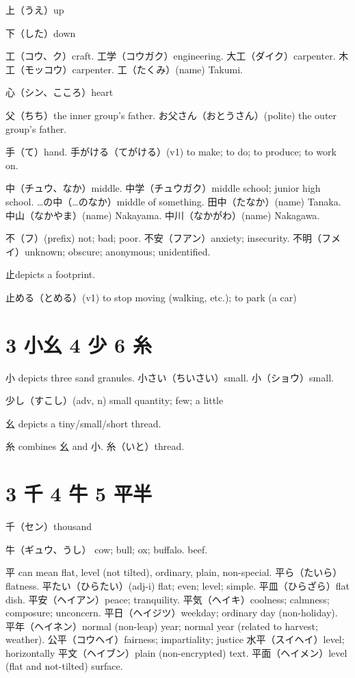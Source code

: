 上（うえ）up

下（した）down

工（コウ、ク）craft.
工学（コウガク）engineering.
大工（ダイク）carpenter.
木工（モッコウ）carpenter.
工（たくみ）(name) Takumi.

心（シン、こころ）heart

父（ちち）the inner group's father.
お父さん（おとうさん）(polite) the outer group's father.

手（て）hand.
手がける（てがける）(v1) to make; to do; to produce; to work on.

中（チュウ、なか）middle.
中学（チュウガク）middle school; junior high school.
…の中（…のなか）middle of something.
田中（たなか）(name) Tanaka.
中山（なかやま）(name) Nakayama.
中川（なかがわ）(name) Nakagawa.

不（フ）(prefix) not; bad; poor.
不安（フアン）anxiety; insecurity.
不明（フメイ）unknown; obscure; anonymous; unidentified.

止depicts a footprint.

止める（とめる）(v1) to stop moving (walking, etc.); to park (a car)

\section{3 小幺 4 少 6 糸}

小 depicts three sand granules.
小さい（ちいさい）small.
小（ショウ）small.

少し（すこし）(adv, n) small quantity; few; a little

幺 depicts a tiny/small/short thread.

糸 combines 幺 and 小.
糸（いと）thread.

\section{3 千 4 牛 5 平半}

千（セン）thousand

牛（ギュウ、うし）
cow; bull; ox; buffalo.
beef.

平 can mean flat, level (not tilted), ordinary, plain, non-special.
平ら（たいら）flatness.
平たい（ひらたい）(adj-i) flat; even; level; simple.
平皿（ひらざら）flat dish.
平安（ヘイアン）peace; tranquility.
平気（ヘイキ）coolness; calmness; composure; unconcern.
平日（ヘイジツ）weekday; ordinary day (non-holiday).
平年（ヘイネン）normal (non-leap) year; normal year (related to harvest; weather).
公平（コウヘイ）fairness; impartiality; justice
水平（スイヘイ）level; horizontally
平文（ヘイブン）plain (non-encrypted) text.
平面（ヘイメン）level (flat and not-tilted) surface.

